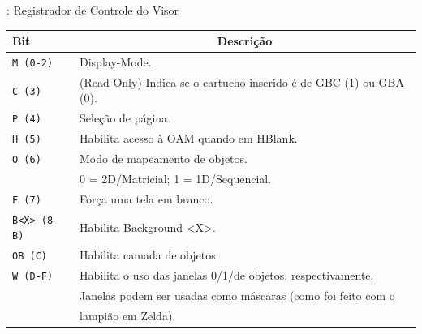 \documentclass{beamer}
\begin{document}
\begin{darkframes}
\begin{frame}{\secname: Registrador de Controle do Visor}
        \scriptsize{\begin{center}
            \begin{tabular}{|l|l|}
                \hline
                Bit & \multicolumn{1}{|c|}{Descrição} \\\hline
                \texttt{M (0-2)} & Display-Mode. \\\hline
                \texttt{C (3)} & (Read-Only) Indica se o cartucho inserido é de GBC (1) ou GBA (0). \\\hline
                \texttt{P (4)} & Seleção de página. \\\hline
                \texttt{H (5)} & Habilita acesso à OAM quando em HBlank. \\\hline
                \texttt{O (6)} & Modo de mapeamento de objetos.\\
                               & 0 = 2D/Matricial; 1 = 1D/Sequencial. \\\hline
                \texttt{F (7)} & Força uma tela em branco. \\\hline
                \texttt{B<X> (8-B)} & Habilita Background <X>. \\\hline
                \texttt{OB (C)} & Habilita camada de objetos. \\\hline
                \texttt{W (D-F)} & Habilita o uso das janelas 0/1/de objetos, respectivamente. \\
                                 & Janelas podem ser usadas como máscaras (como foi feito com o \\
                                 & lampião em Zelda). \\\hline
            \end{tabular}
        \end{center}}
    \end{frame}


\end{darkframes}
\end{document}
